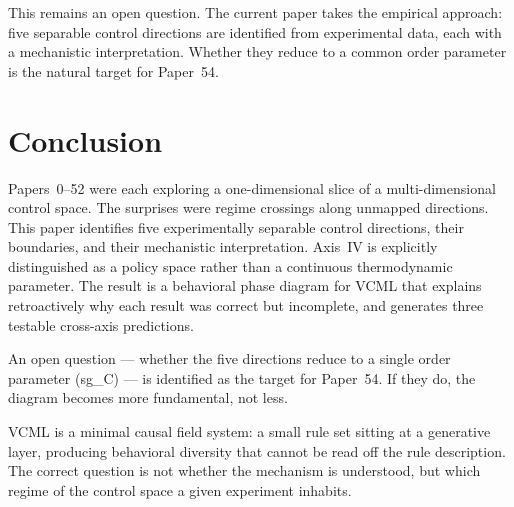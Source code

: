 \documentclass[11pt,a4paper]{article}
\begin{document}
This remains an open question.
The current paper takes the empirical approach: five separable control
directions are identified from experimental data, each with a mechanistic
interpretation.
Whether they reduce to a common order parameter is the natural target for
Paper~54.

\section{Conclusion}

Papers~0--52 were each exploring a one-dimensional slice of a multi-dimensional
control space.
The surprises were regime crossings along unmapped directions.
This paper identifies five experimentally separable control directions, their
boundaries, and their mechanistic interpretation.
Axis~IV is explicitly distinguished as a policy space rather than a
continuous thermodynamic parameter.
The result is a behavioral phase diagram for VCML that explains retroactively
why each result was correct but incomplete, and generates three testable
cross-axis predictions.

An open question --- whether the five directions reduce to a single order
parameter (sg\_C) --- is identified as the target for Paper~54.
If they do, the diagram becomes more fundamental, not less.

VCML is a minimal causal field system: a small rule set sitting at a generative
layer, producing behavioral diversity that cannot be read off the rule
description.
The correct question is not whether the mechanism is understood, but which
regime of the control space a given experiment inhabits.
\end{document}
